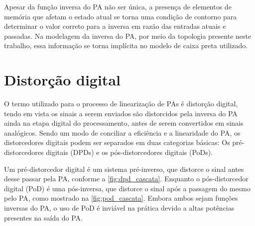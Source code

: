 
Apesar da função inversa do PA não ser única, a presença de elementos de memória que afetam o estado atual se torna uma condição de contorno para determinar o valor correto para a inversa em razão das entradas atuais e passadas. Na modelagem da inversa do PA, por meio da topologia presente neste trabalho, essa informação se torna implícita no modelo de caixa preta utilizado.

\section{Distorção digital} \label{sec:fundteo-distor}
O termo utilizado para o processo de linearização de PAs é distorção digital, tendo em vista os sinais a serem enviados são distorcidos pela inversa do PA ainda na etapa digital do processamento, antes de serem convertidos em sinais analógicos. Sendo um modo de conciliar a eficiência e a linearidade do PA, os distorcedores digitais podem ser separados em duas categorias básicas: Os pré-distorcedores digitais (DPDs) e os pós-distorcedores digitais (PoDs).

Um pré-distorcedor digital é um sistema pré-inverso, que distorce o sinal antes desse passar pela PA, conforme a \autoref{fig:dpd_cascata}. Enquanto o pós-distorcedor digital (PoD) é uma pós-inversa, que distorce o sinal após a passagem do mesmo pelo PA, como mostrado na \autoref{fig:pod_cascata}. Embora ambos sejam funções inversas do PA, o uso de PoD é inviável na prática devido a altas potências presentes na saída do PA.

